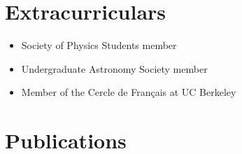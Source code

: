 \documentclass[letterpaper,10pt]{article}
\newcommand{\resumeSubHeadingListStart}{\begin{itemize}[leftmargin=*]}
\newcommand{\resumeSubHeadingListEnd}{\end{itemize}}
\newcommand{\shorterSection}[1]{\vspace{-10pt}\section{#1}}
\begin{document}
\shorterSection{Extracurriculars}
  \resumeSubHeadingListStart
  \small
    \item{Society of Physics Students member}
    \vspace{-5pt}
    \item{Undergraduate Astronomy Society member}
    \vspace{-5pt}
    \item{Member of the Cercle de Français at UC Berkeley}
  \resumeSubHeadingListEnd
  

\shorterSection{Publications}

\resumeSubHeadingListStart
\small


\resumeSubHeadingListEnd
\end{document}
